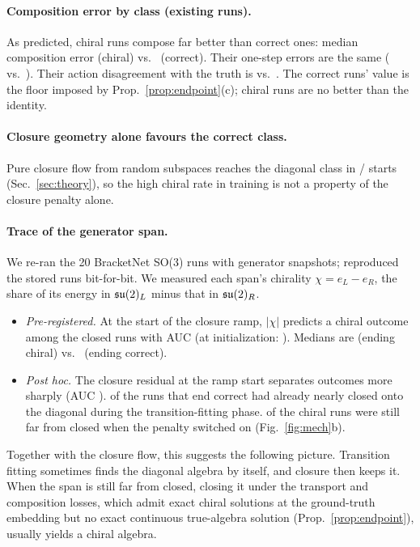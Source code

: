 \paragraph{Composition error by class (existing runs).}
As predicted, chiral runs compose far better than correct ones: median composition error \REoneIncorrectclosedchiralComp{}
(chiral) vs.\ \REoneCorrectclosedComp{} (correct). Their one-step errors are the same (\REoneIncorrectclosedchiralMseone{}
vs.\ \REoneCorrectclosedMseone). Their action disagreement with the truth is \REoneIncorrectclosedchiralAction{} vs.\
\REoneCorrectclosedAction. The correct runs' value is the floor imposed by Prop.~\ref{prop:endpoint}(c); chiral
runs are no better than the identity.

\paragraph{Closure geometry alone favours the correct class.}
Pure closure flow from random subspaces reaches the diagonal class in \RFlowDiag/\RFlowN{} starts
(Sec.~\ref{sec:theory}), so the high chiral rate in training is not a property of the closure penalty alone.

\paragraph{Trace of the generator span.}
We re-ran the 20 BracketNet SO(3) runs with generator snapshots; \REtwoIdentical{} reproduced the stored runs
bit-for-bit. We measured each span's chirality $\chi=e_L-e_R$, the share of its energy in $\mathfrak{su}(2)_L$ minus that
in $\mathfrak{su}(2)_R$.
\begin{itemize}
\item \emph{Pre-registered.} At the start of the closure ramp, $|\chi|$ predicts a chiral outcome among the
\REtwoNclosed{} closed runs with AUC \REtwoAucramp{} (at initialization: \REtwoAucinit). Medians are
\REtwoChirampIncorrectclosedchiral{} (ending chiral) vs.\ \REtwoChirampCorrectclosed{} (ending correct).
\item \emph{Post hoc.} The closure residual at the ramp start separates outcomes more sharply (AUC
\REtwoAucclosure). \REtwoCorrectnear{} of the \REtwoNcorrect{} runs that end correct had already nearly closed onto
the diagonal during the transition-fitting phase. \REtwoChiralfar{} of the \REtwoNchiral{} chiral runs were still
far from closed when the penalty switched on (Fig.~\ref{fig:mech}b).
\end{itemize}
Together with the closure flow, this suggests the following picture. Transition fitting sometimes finds the
diagonal algebra by itself, and closure then keeps it. When the span is still far from closed, closing it under the
transport and composition losses, which admit exact chiral solutions at the ground-truth embedding but no exact
continuous true-algebra solution (Prop.~\ref{prop:endpoint}), usually yields a
chiral algebra.

